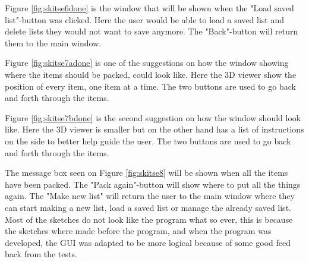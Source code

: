 
Figure \ref{fig:skitse6done} is the window that will be shown when the "Load saved list"-button was clicked. Here the user would be able to load a saved list and delete lists they would not want to save anymore. The "Back"-button will return them to the main window.


Figure \ref{fig:skitse7adone} is one of the suggestions on how the window showing where the items should be packed, could look like. Here the 3D viewer show the position of every item, one item at a time. The two buttons are used to go back and forth through the items.


Figure \ref{fig:skitse7bdone} is the second suggestion on how the window should look like. Here the 3D viewer is smaller but on the other hand has a list of instructions on the side to better help guide the user. The two buttons are used to go back and forth through the items.


The message box seen on Figure \ref{fig:skitse8} will be shown when all the items have been packed. The "Pack again"-button will show where to put all the things again. The "Make new list" will return the user to the main window where they can start making a new list, load a saved list or manage the already saved list. Most of the sketches do not look like the program what so ever, this is because the sketches where made before the program, and when the program was developed, the GUI was adapted to be more logical because of some good feed back from the tests.
